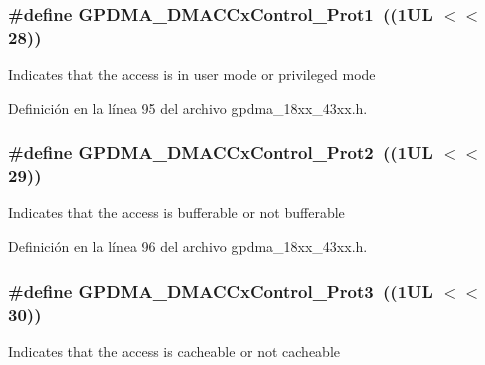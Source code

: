 \subsubsection[{\texorpdfstring{G\+P\+D\+M\+A\+\_\+\+D\+M\+A\+C\+Cx\+Control\+\_\+\+Prot1}{GPDMA_DMACCxControl_Prot1}}]{\setlength{\rightskip}{0pt plus 5cm}\#define G\+P\+D\+M\+A\+\_\+\+D\+M\+A\+C\+Cx\+Control\+\_\+\+Prot1~((1\+U\+L $<$$<$ 28))}\hypertarget{group___g_p_d_m_a__18_x_x__43_x_x_ga883ee41e16f8df248437075cebab7993}{}\label{group___g_p_d_m_a__18_x_x__43_x_x_ga883ee41e16f8df248437075cebab7993}
Indicates that the access is in user mode or privileged mode 

Definición en la línea 95 del archivo gpdma\+\_\+18xx\+\_\+43xx.\+h.

\subsubsection[{\texorpdfstring{G\+P\+D\+M\+A\+\_\+\+D\+M\+A\+C\+Cx\+Control\+\_\+\+Prot2}{GPDMA_DMACCxControl_Prot2}}]{\setlength{\rightskip}{0pt plus 5cm}\#define G\+P\+D\+M\+A\+\_\+\+D\+M\+A\+C\+Cx\+Control\+\_\+\+Prot2~((1\+U\+L $<$$<$ 29))}\hypertarget{group___g_p_d_m_a__18_x_x__43_x_x_gabe38faff26ee3951122c23ff1425d70a}{}\label{group___g_p_d_m_a__18_x_x__43_x_x_gabe38faff26ee3951122c23ff1425d70a}
Indicates that the access is bufferable or not bufferable 

Definición en la línea 96 del archivo gpdma\+\_\+18xx\+\_\+43xx.\+h.

\subsubsection[{\texorpdfstring{G\+P\+D\+M\+A\+\_\+\+D\+M\+A\+C\+Cx\+Control\+\_\+\+Prot3}{GPDMA_DMACCxControl_Prot3}}]{\setlength{\rightskip}{0pt plus 5cm}\#define G\+P\+D\+M\+A\+\_\+\+D\+M\+A\+C\+Cx\+Control\+\_\+\+Prot3~((1\+U\+L $<$$<$ 30))}\hypertarget{group___g_p_d_m_a__18_x_x__43_x_x_gaf6a439bbf5a4b082fa7f36effca23f15}{}\label{group___g_p_d_m_a__18_x_x__43_x_x_gaf6a439bbf5a4b082fa7f36effca23f15}
Indicates that the access is cacheable or not cacheable 

